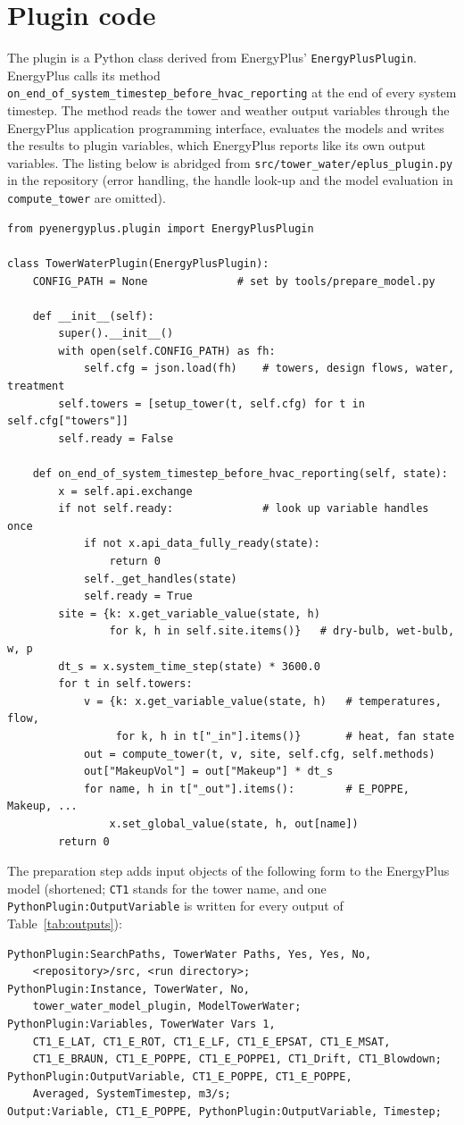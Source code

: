 \documentclass[preprint,12pt]{elsarticle}
\begin{document}
\section{Plugin code}\label{app:code}
The plugin is a Python class derived from EnergyPlus' \texttt{EnergyPlusPlugin}. EnergyPlus calls its method
\texttt{on\_end\_of\_system\_timestep\_before\_hvac\_reporting} at the end of every system timestep. The method reads the
tower and weather output variables through the EnergyPlus application programming interface, evaluates the models and
writes the results to plugin variables, which EnergyPlus reports like its own output variables. The listing below is
abridged from \texttt{src/tower\_water/eplus\_plugin.py} in the repository (error handling, the handle look-up and the
model evaluation in \texttt{compute\_tower} are omitted).
\begin{verbatim}
from pyenergyplus.plugin import EnergyPlusPlugin

class TowerWaterPlugin(EnergyPlusPlugin):
    CONFIG_PATH = None              # set by tools/prepare_model.py

    def __init__(self):
        super().__init__()
        with open(self.CONFIG_PATH) as fh:
            self.cfg = json.load(fh)    # towers, design flows, water, treatment
        self.towers = [setup_tower(t, self.cfg) for t in self.cfg["towers"]]
        self.ready = False

    def on_end_of_system_timestep_before_hvac_reporting(self, state):
        x = self.api.exchange
        if not self.ready:              # look up variable handles once
            if not x.api_data_fully_ready(state):
                return 0
            self._get_handles(state)
            self.ready = True
        site = {k: x.get_variable_value(state, h)
                for k, h in self.site.items()}   # dry-bulb, wet-bulb, w, p
        dt_s = x.system_time_step(state) * 3600.0
        for t in self.towers:
            v = {k: x.get_variable_value(state, h)   # temperatures, flow,
                 for k, h in t["_in"].items()}       # heat, fan state
            out = compute_tower(t, v, site, self.cfg, self.methods)
            out["MakeupVol"] = out["Makeup"] * dt_s
            for name, h in t["_out"].items():        # E_POPPE, Makeup, ...
                x.set_global_value(state, h, out[name])
        return 0
\end{verbatim}
The preparation step adds input objects of the following form to the EnergyPlus model (shortened; \texttt{CT1} stands
for the tower name, and one \texttt{PythonPlugin:OutputVariable} is written for every output of Table~\ref{tab:outputs}):
\begin{verbatim}
PythonPlugin:SearchPaths, TowerWater Paths, Yes, Yes, No,
    <repository>/src, <run directory>;
PythonPlugin:Instance, TowerWater, No,
    tower_water_model_plugin, ModelTowerWater;
PythonPlugin:Variables, TowerWater Vars 1,
    CT1_E_LAT, CT1_E_ROT, CT1_E_LF, CT1_E_EPSAT, CT1_E_MSAT,
    CT1_E_BRAUN, CT1_E_POPPE, CT1_E_POPPE1, CT1_Drift, CT1_Blowdown;
PythonPlugin:OutputVariable, CT1_E_POPPE, CT1_E_POPPE,
    Averaged, SystemTimestep, m3/s;
Output:Variable, CT1_E_POPPE, PythonPlugin:OutputVariable, Timestep;
\end{verbatim}



\end{document}
